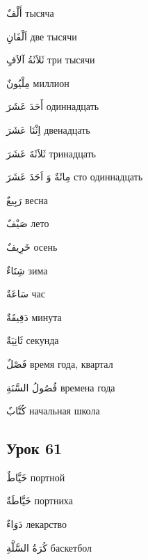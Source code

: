 \documentclass[a5paper]{article}
\newcommand\textstyleDropCaps[1]{#1}
\newcommand\textstyleCaptioncharacters[1]{#1}
\begin{document}
\textstyleCaptioncharacters{أَلْفٌ }\textstyleDropCaps{тысяча‎}

\textstyleCaptioncharacters{اَلْفَانِ }\textstyleDropCaps{две тысячи‎}

\textstyleCaptioncharacters{ثَلاَثَةُ آلاَفٍ }\textstyleDropCaps{три тысячи‎}

\textstyleCaptioncharacters{مِلْيُونٌ }\textstyleDropCaps{миллион‎}

\textstyleCaptioncharacters{أَحَدَ عَشَرَ }\textstyleDropCaps{одиннадцать‎}

\textstyleCaptioncharacters{اِثْنَا عَشَرَ }\textstyleDropCaps{двенадцать‎}

\textstyleCaptioncharacters{ثَلاَثَةَ عَشَرَ }\textstyleDropCaps{тринадцать‎}

\textstyleCaptioncharacters{مِائَةٌ وَ اَحَدَ عَشَرَ }\textstyleDropCaps{сто одиннадцать‎}

\textstyleCaptioncharacters{رَبِيعٌ }\textstyleDropCaps{весна ‎}

\textstyleCaptioncharacters{صَيْفٌ }\textstyleDropCaps{лето‎}

\textstyleCaptioncharacters{خَرِيفٌ }\textstyleDropCaps{осень‎}

\textstyleCaptioncharacters{شِتَاءٌ }\textstyleDropCaps{зима‎}

\textstyleCaptioncharacters{سَاعَةٌ }\textstyleDropCaps{час‎}

\textstyleCaptioncharacters{دَقِيقَةٌ }\textstyleDropCaps{минута‎}

\textstyleCaptioncharacters{ثَانِيَةٌ }\textstyleDropCaps{секунда‎}

\textstyleCaptioncharacters{فَصْلٌ }\textstyleDropCaps{время года, квартал‎}

\textstyleCaptioncharacters{فُصُولُ السَّنَةِ }\textstyleDropCaps{времена года‎}

\textstyleCaptioncharacters{كُتَّابٌ }\textstyleDropCaps{начальная школа‎}

\subsection[Урок 61‎]{\textstyleDropCaps{Урок 61‎}}
\textstyleCaptioncharacters{خَيَّاطٌ }\textstyleDropCaps{портной‎}

\textstyleCaptioncharacters{خَيَّاطَةٌ }\textstyleDropCaps{портниха‎}

\textstyleCaptioncharacters{دَوَاءٌ }\textstyleDropCaps{лекарство‎}

\textstyleCaptioncharacters{كُرَةُ السَّلَّةِ }\textstyleDropCaps{баскетбол‎}
\end{document}
